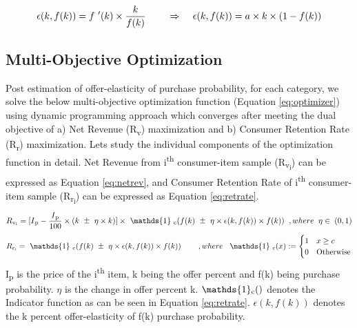  \begin{equation}
    \epsilon(k,f(k)) = f\textsuperscript{'}(k) \times\frac{k}{f(k)} \;\;\;\; \;\;\;\;
    \Rightarrow \;\;\;\;\epsilon(k,f(k)) = a\times k\times (1 - f(k))
    \label{eq:offerelasticity}
  \end{equation}

\subsection{Multi-Objective Optimization}
Post estimation of offer-elasticity of purchase probability, for each category, we solve the below multi-objective
optimization function (Equation \ref{eq:optimizer}) using dynamic programming approach 
which converges after meeting the dual objective of
a) Net Revenue (R\textsubscript{v}) maximization and b) Consumer Retention Rate (R\textsubscript{r}) maximization.
Lets study the individual components of the optimization function in detail.
Net Revenue from i\textsuperscript{th} consumer-item sample (R\textsubscript{v\textsubscript{i}}) 
can be expressed as Equation \ref{eq:netrev}, and Consumer Retention Rate  of 
i\textsuperscript{th} consumer-item sample (R\textsubscript{r\textsubscript{i}}) can be expressed as Equation \ref{eq:retrate}.
 \begin{equation}
    R\textsubscript{v\textsubscript{i}} = [I\textsubscript{p} - \frac{I\textsubscript{p}}{100} \times (k \mypm \eta\times k)]
    \times
    \ \mathds{1} \ \textsubscript{c}(f(k) \mypm \eta\times \epsilon(k,f(k))\times f(k))
    \;\; , where \;\;
    \eta \in \; (0,1)
    \label{eq:netrev}
  \end{equation}
  \begin{equation}
    R\textsubscript{r\textsubscript{i}} = \ \mathds{1} \ \textsubscript{c}(f(k) \mypm \eta\times 
    \epsilon(k,f(k))\times f(k))
    \;\;\;\;\;\;\;\;   , where \;\;
    \ \mathds{1} \ \textsubscript{c}(x) :=
        \begin{cases}
          1 & x \geq c\\
          0 & \text{Otherwise}
        \end{cases}
    \label{eq:retrate}
  \end{equation}
I\textsubscript{p} is the price of the i\textsuperscript{th} item, k being the offer percent and f(k) being purchase probability.
$\eta$ is the change in offer percent k. $ \mathds{1} \textsubscript{c}()$ denotes the Indicator function as can be seen 
in Equation \ref{eq:retrate}. $\epsilon(k,f(k))$ denotes the k percent offer-elasticity of f(k) purchase probability.


